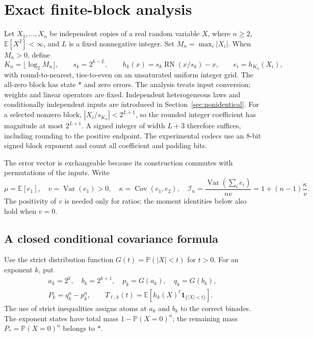 \section{Exact finite-block analysis}\label{sec:exact}

Let $X_1,\ldots,X_n$ be independent copies of a real random variable $X$,
where $n\ge2$, $\mathbb E[X^2]<\infty$, and $L$ is a fixed nonnegative
integer. Set $M_n=\max_i|X_i|$. When $M_n>0$, define
\begin{equation}\label{eq:revision-format}
 K_n=\lfloor\log_2 M_n\rfloor,\qquad s_k=2^{k-L},\qquad
 h_k(x)=s_k\operatorname{RN}(x/s_k)-x,\qquad e_i=h_{K_n}(X_i),
\end{equation}
with round-to-nearest, ties-to-even on an unsaturated uniform integer grid.
The all-zero block has state $*$ and zero errors.
The analysis treats input conversion; weights and linear operators are fixed.
Independent heterogeneous laws and conditionally independent inputs are
introduced in Section~\ref{sec:nonidentical}. For a selected nonzero block,
$|X_i/s_{K_n}|<2^{L+1}$, so the rounded integer coefficient has magnitude
at most $2^{L+1}$. A signed integer of width $L+3$ therefore suffices,
including rounding to the positive endpoint. The experimental codecs use an
8-bit signed block exponent and count all coefficient and padding bits.

The error vector is exchangeable because its construction commutes with
permutations of the inputs. Write
\begin{equation}\label{eq:revision-statistics}
 \mu=\mathbb E[e_1],\quad v=\operatorname{Var}(e_1)>0,\quad
 \kappa=\operatorname{Cov}(e_1,e_2),\quad
 \mathcal I_n=\frac{\operatorname{Var}(\sum_i e_i)}{nv}
             =1+(n-1)\frac{\kappa}{v}.
\end{equation}
The positivity of $v$ is needed only for ratios; the moment identities below
also hold when $v=0$.

\subsection{A closed conditional covariance formula}

Use the strict distribution function
$G(t)=\mathbb P(|X|<t)$ for $t>0$. For an exponent $k$, put
\begin{equation}\label{eq:revision-truncations}
 \begin{gathered}
 a_k=2^k,\quad b_k=2^{k+1},\quad p_k=G(a_k),\quad q_k=G(b_k),\\
 P_k=q_k^n-p_k^n,\qquad
 T_{\ell,k}(t)=\mathbb E[h_k(X)^\ell\mathbf 1_{\{|X|<t\}}].
 \end{gathered}
\end{equation}
The use of strict inequalities assigns atoms at $a_k$ and $b_k$ to the
correct binades. The exponent states have total mass
$1-\mathbb P(X=0)^n$; the remaining mass $P_*=\mathbb P(X=0)^n$ belongs to $*$.

